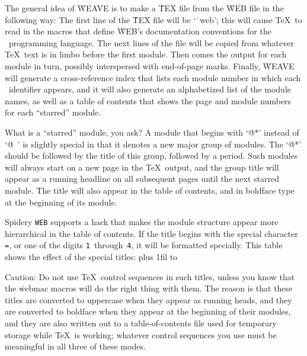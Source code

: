 The general idea of \.{WEAVE} is to make a \.{TEX} file from the \.{WEB}
file in the following way: The first line of the \.{TEX} file will be
`\.{\ \PAS web}'; this will cause \TeX\ to read in the macros that
define \.{WEB}'s documentation conventions
\newstuff 
for the \PASCAL\ programming language.
\endnewstuff
The next lines of the file
will be copied from whatever \TeX\ text is in limbo before the first
module.
Then comes the output for each module in turn, possibly
interspersed with end-of-page marks.
Finally, \.{WEAVE} will generate a
cross-reference index that lists each module number in which each \PASCAL\
identifier appears, and it will also generate an alphabetized list
of the module names, as well as a table of contents that
shows the page and module numbers for each ``starred'' module.

What is a ``starred'' module, you ask?
A module that begins with `\.{@*}'
instead of `\.{@\ }' is slightly special in that it denotes a new major
group of modules.
The `\.{@*}' should be followed by the title of this
group, followed by a period.
Such modules will always start on a new page
in the \TeX\ output, and the group title will appear as a running headline
on all subsequent pages until the next starred module.
The title will also
appear in the table of contents, and in boldface type at the beginning of
its module.

\newstuff
Spidery {\tt WEB} supports a hack that makes the module structure
appear more hierarchical in the table of contents.
If the title begins with the special character {\tt =}, or one of the
digits {\tt 1}~through~{\tt 4}, it will be formatted specially.
This table shows the effect of the special titles:
\medskip
{
\tabskip=0pt plus 1fil
\noindent\halign to 
}
\medskip
\endnewstuff

Caution:  Do not use \TeX\ control sequences in such titles,
unless you know that the \.{webmac} macros will do the right thing with
them.
The reason is that these titles are converted to uppercase when
they appear as running heads, and they are converted to boldface when they
appear at the beginning of their modules, and they are also written out to
a table-of-contents file used for temporary storage while \TeX\ is
working; whatever control sequences you use must be meaningful in all
three of these modes.

